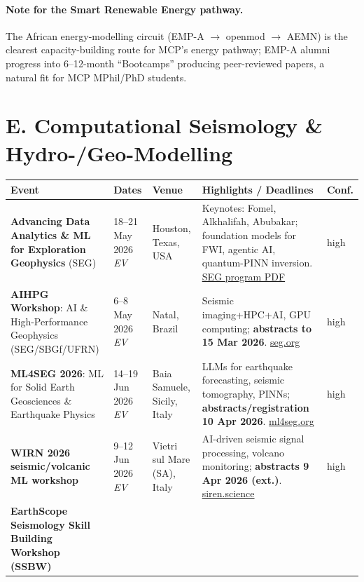 \documentclass[11pt,a4paper]{article}
\newcommand{\ev}{\emph{EV}}
\begin{document}
\paragraph{Note for the Smart Renewable Energy pathway.} The African energy-modelling circuit (EMP-A $\rightarrow$ openmod $\rightarrow$ AEMN) is the clearest capacity-building route for MCP's energy pathway; EMP-A alumni progress into 6--12-month ``Bootcamps'' producing peer-reviewed papers, a natural fit for MCP MPhil/PhD students.

\section{E. Computational Seismology \& Hydro-/Geo-Modelling}

\begin{longtable}{@{}p{3.2cm}p{3.0cm}p{2.5cm}p{5.2cm}p{1.6cm}@{}}
\toprule
\textbf{Event} & \textbf{Dates} & \textbf{Venue} & \textbf{Highlights / Deadlines} & \textbf{Conf.} \\
\midrule
\endhead
\textbf{Advancing Data Analytics \& ML for Exploration Geophysics} (SEG)
  & 18--21 May 2026 \ev{}
  & Houston, Texas, USA
  & Keynotes: Fomel, Alkhalifah, Abubakar; foundation models for FWI, agentic AI, quantum-PINN inversion. \href{https://seg.org/wp-content/uploads/2026/05/Advancing_Data_Analytics_and_ML_Workshop_Technical_Program_V10.pdf}{SEG program PDF}
  & high \\
\midrule
\textbf{AIHPG Workshop}: AI \& High-Performance Geophysics (SEG/SBGf/UFRN)
  & 6--8 May 2026 \ev{}
  & Natal, Brazil
  & Seismic imaging+HPC+AI, GPU computing; \textbf{abstracts to 15 Mar 2026}. \href{https://seg.org/calendar_events/artificial-intelligence-high-performance-geophysics-workshop/}{seg.org}
  & high \\
\midrule
\textbf{ML4SEG 2026}: ML for Solid Earth Geosciences \& Earthquake Physics
  & 14--19 Jun 2026 \ev{}
  & Baia Samuele, Sicily, Italy
  & LLMs for earthquake forecasting, seismic tomography, PINNs; \textbf{abstracts/registration 10 Apr 2026}. \href{https://www.ml4seg.org/}{ml4seg.org}
  & high \\
\midrule
\textbf{WIRN 2026 seismic/volcanic ML workshop}
  & 9--12 Jun 2026 \ev{}
  & Vietri sul Mare (SA), Italy
  & AI-driven seismic signal processing, volcano monitoring; \textbf{abstracts 9 Apr 2026 (ext.)}. \href{https://siren.science/workshop-seismic.html}{siren.science}
  & high \\
\midrule
\textbf{EarthScope Seismology Skill Building Workshop (SSBW)}

\end{longtable}
\end{document}
